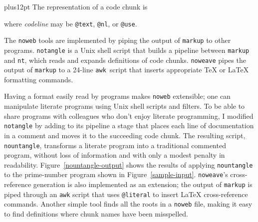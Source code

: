 \vskip0pt plus12pt
The representation of a code chunk is
\begin{quote}
\leavevmode{}
\end{quote}
where {\it codeline} may be {\tt @text}, {\tt @nl}, or {\tt @use}.

The \verb+noweb+ tools are implemented by piping the output of
\verb+markup+ to other programs.
\verb+notangle+ is a Unix shell script that builds a
pipeline between \verb+markup+ and \verb+nt+, which reads
and expands definitions of code chunks.
\verb+noweave+ pipes the output of \verb+markup+ to a 24-line
\verb+awk+~script that inserts appropriate {\TeX} or {\LaTeX}
formatting commands.

Having a format easily read by programs makes {\tt noweb} extensible;
one can manipulate literate programs using Unix shell scripts and
filters.
To be able to share programs with colleagues who don't enjoy literate
programming, I modified \verb+notangle+ by adding to its pipeline a
stage that
places each line of documentation in a comment and moves it to
the succeeding code chunk.  The resulting script, \verb+nountangle+,
transforms a literate 
program into a traditional commented program, without loss of
information and with only a modest penalty in readability.
Figure~\ref{nountangle-output} shows the results of applying
\verb+nountangle+ to the prime-number program shown in
Figure~\ref{sample-input}. 
\verb+noweave+'s cross-reference generation is also implemented as an
extension; the output of \verb+markup+ is piped through an \verb+awk+
script that uses \verb+@literal+ to insert {\LaTeX} cross-reference
commands.
Another simple tool finds all the roots in a {\tt noweb} file, making
it easy to find definitions where chunk names have been misspelled.

